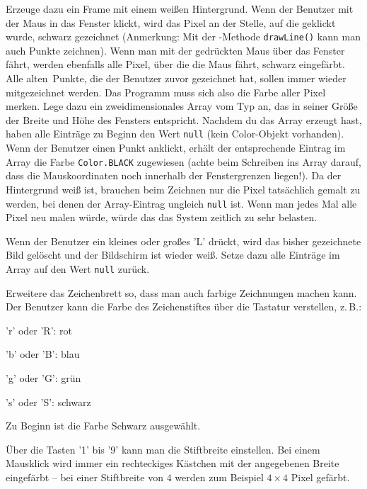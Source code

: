 \begin{compactenum}[a)]
\item Erzeuge dazu ein Frame mit einem weißen Hintergrund. Wenn der Benutzer
mit der Maus in das Fenster klickt, wird das Pixel an der Stelle, auf die
geklickt wurde, schwarz gezeichnet (Anmerkung: Mit der
-Methode \lstinline|drawLine()| kann man auch Punkte
zeichnen). Wenn man mit der gedrückten Maus über das Fenster fährt, werden
ebenfalls alle Pixel, über die die Maus fährt, schwarz eingefärbt. Alle
\glqq alten\grqq\ Punkte, die der Benutzer zuvor gezeichnet hat, sollen immer
wieder mitgezeichnet werden. Das Programm muss sich also die Farbe aller Pixel
merken. Lege dazu ein zweidimensionales Array vom Typ  an, das
in seiner Größe der Breite und Höhe des Fensters entspricht. Nachdem du das
Array erzeugt hast, haben alle Einträge zu Beginn den Wert \lstinline|null|
(\glqq kein Color-Objekt vorhanden\grqq ). Wenn der Benutzer einen Punkt
anklickt, erhält der entsprechende Eintrag im Array die Farbe
\lstinline|Color.BLACK| zugewiesen (achte beim Schreiben ins Array darauf,
dass die Mauskoordinaten noch innerhalb der Fenstergrenzen liegen!). Da der
Hintergrund weiß ist, brauchen beim Zeichnen nur die Pixel tatsächlich gemalt
zu werden, bei denen der Array-Eintrag ungleich \lstinline|null| ist. Wenn
man jedes Mal alle Pixel neu malen würde, würde das das System zeitlich zu sehr
belasten.

\item Wenn der Benutzer ein kleines oder großes 'L' drückt, wird das bisher
gezeichnete Bild gelöscht und der Bildschirm ist wieder weiß. Setze dazu alle
Einträge im Array auf den Wert \lstinline|null| zurück.

\item Erweitere das Zeichenbrett so, dass man auch farbige Zeichnungen machen
kann. Der Benutzer kann die Farbe des Zeichenstiftes über die Tastatur
verstellen, z.\,B.:

'r' oder 'R': rot

'b' oder 'B': blau

'g' oder 'G': grün

's' oder 'S': schwarz

Zu Beginn ist die Farbe Schwarz ausgewählt. 

\item Über die Tasten '1' bis '9' kann man die Stiftbreite einstellen. Bei
einem Mausklick wird immer ein rechteckiges Kästchen mit der angegebenen
Breite eingefärbt -- bei einer Stiftbreite von $4$ werden zum Beispiel
$4 \times 4$ Pixel gefärbt.


\end{compactenum}

